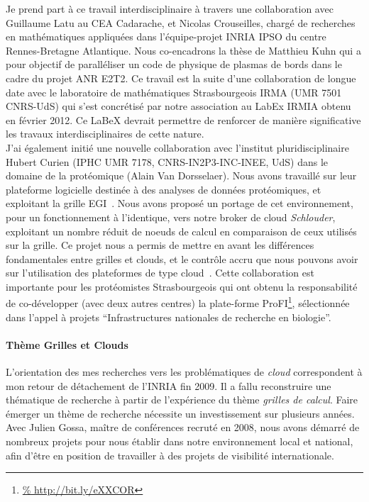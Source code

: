 \documentclass[11pt]{article}
\begin{document}
Je prend part  à ce travail interdisciplinaire à travers  une collaboration avec
Guillaume Latu au CEA Cadarache, et Nicolas Crouseilles, chargé de recherches en
mathématiques   appliquées   dans   l'équipe-projet   INRIA   IPSO   du   centre
Rennes-Bretagne Atlantique.  Nous  co-encadrons la thèse de Matthieu  Kuhn qui a
pour objectif de  paralléliser un code de  physique de plasmas de  bords dans le
cadre du projet ANR E2T2. Ce travail  est la suite d'une collaboration de longue
date  avec  le  laboratoire  de  mathématiques  Strasbourgeois  IRMA  (UMR  7501
CNRS-UdS) qui  s'est concrétisé par notre  association au LabEx IRMIA  obtenu en
février 2012. Ce  LaBeX devrait permettre de renforcer  de manière significative
les travaux interdisciplinaires de cette nature.\\


J'ai   également   initié   une    nouvelle   collaboration   avec   l'institut
pluridisciplinaire Hubert Curien (IPHC  UMR 7178, CNRS-IN2P3-INC-INEE, UdS) dans
le domaine  de la protéomique (Alain  Van Dorsselaer). Nous avons  travaillé sur
leur plateforme logicielle  destinée à des analyses de  données protéomiques, et
exploitant la grille EGI~\cite{iphc-2011}.  Nous avons proposé un portage de cet
environnement, pour un fonctionnement à  l'identique, vers notre broker de cloud
\textit{Schlouder},  exploitant  un  nombre  réduit   de  noeuds  de  calcul  en
comparaison de ceux utilisés sur la grille. Ce projet nous a permis de mettre en
avant  les différences  fondamentales entre  grilles et  clouds, et  le contrôle
accru  que  nous  pouvons  avoir  sur  l'utilisation  des  plateformes  de  type
cloud~\cite{MichonGGFB13}.    Cette  collaboration   est  importante   pour  les
protéomistes Strasbourgeois  qui ont  obtenu la responsabilité  de co-développer
(avec    deux    autres    centres)   la    plate-forme    ProFI\footnote{\url{%
    http://bit.ly/eXXCOR}},    sélectionnée     dans    l'appel     à    projets
``Infrastructures nationales de recherche en biologie''.



\paragraph{Thème Grilles et Clouds}

L'orientation  des  mes  recherches  vers  les  problématiques  de  \emph{cloud}
correspondent  à mon  retour de  détachement de  l'INRIA fin  2009.  Il  a fallu
reconstruire  une thématique  de recherche  à  partir de  l'expérience du  thème
\textit{grilles de  calcul}. Faire  émerger un thème  de recherche  nécessite un
investissement sur  plusieurs années. Avec  Julien Gossa, maître  de conférences
recruté en 2008,  nous avons démarré de nombreux projets  pour nous établir dans
notre environnement local  et national, afin d'être en position  de travailler à
des projets de visibilité internationale.
\end{document}
